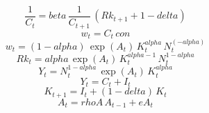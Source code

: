 \begin{dmath}
\frac{1}{{C}_{t}}={beta}\, \frac{1}{{C}_{t+1}}\, \left({Rk}_{t+1}+1-{delta}\right)
\end{dmath}
\begin{dmath}
{w}_{t}={C}_{t}\, {con}
\end{dmath}
\begin{dmath}
{w}_{t}=\left(1-{alpha}\right)\, \exp\left({A}_{t}\right)\, {K}_{t}^{{alpha}}\, {N}_{t}^{\left(-{alpha}\right)}
\end{dmath}
\begin{dmath}
{Rk}_{t}={alpha}\, \exp\left({A}_{t}\right)\, {K}_{t}^{{alpha}-1}\, {N}_{t}^{1-{alpha}}
\end{dmath}
\begin{dmath}
{Y}_{t}={N}_{t}^{1-{alpha}}\, \exp\left({A}_{t}\right)\, {K}_{t}^{{alpha}}
\end{dmath}
\begin{dmath}
{Y}_{t}={C}_{t}+{I}_{t}
\end{dmath}
\begin{dmath}
{K}_{t+1}={I}_{t}+\left(1-{delta}\right)\, {K}_{t}
\end{dmath}
\begin{dmath}
{A}_{t}={rhoA}\, {A}_{t-1}+{eA}_{t}
\end{dmath}
